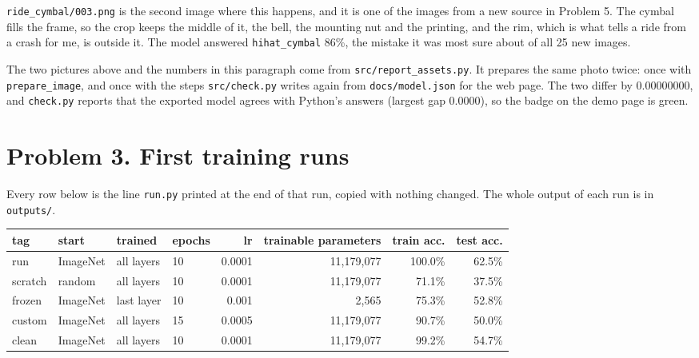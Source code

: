 \documentclass[11pt]{article}
\begin{document}
\begin{center}\end{center}

\texttt{ride\_cymbal/003.png} is the second image where this happens, and it is
one of the images from a new source in Problem 5. The cymbal fills the frame,
so the crop keeps the middle of it, the bell, the mounting nut and the printing,
and the rim, which is what tells a ride from a crash for me, is outside it. The
model answered \texttt{hihat\_cymbal} 86\%, the mistake it was most sure about
of all 25 new images.

\begin{center}\end{center}

The two pictures above and the numbers in this paragraph come from
\texttt{src/report\_assets.py}. It prepares the same photo twice: once with
\texttt{prepare\_image}, and once with the steps \texttt{src/check.py} writes
again from \texttt{docs/model.json} for the web page. The two differ by
0.00000000, and \texttt{check.py} reports that the exported model agrees with
Python's answers (largest gap 0.0000), so the badge on the demo page is green.

\section*{Problem 3. First training runs}

Every row below is the line \texttt{run.py} printed at the end of that run,
copied with nothing changed. The whole output of each run is in \texttt{outputs/}.

\begin{center}\footnotesize
\begin{tabular}{llllrrrr}
\toprule
tag & start & trained & epochs & lr & trainable parameters & train acc. & test acc. \\
\midrule
run     & ImageNet & all layers & 10 & 0.0001 & 11,179,077 & 100.0\% & 62.5\% \\
scratch & random   & all layers & 10 & 0.0001 & 11,179,077 &  71.1\% & 37.5\% \\
frozen  & ImageNet & last layer & 10 & 0.001  &      2,565 &  75.3\% & 52.8\% \\
custom  & ImageNet & all layers & 15 & 0.0005 & 11,179,077 &  90.7\% & 50.0\% \\
clean   & ImageNet & all layers & 10 & 0.0001 & 11,179,077 &  99.2\% & 54.7\% \\
\bottomrule
\end{tabular}
\end{center}
\end{document}
